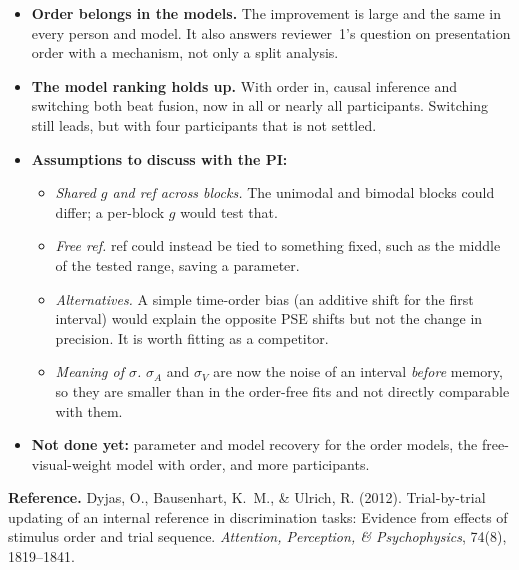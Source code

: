 \documentclass[11pt,a4paper]{article}
\begin{document}
\begin{itemize}
  \item \textbf{Order belongs in the models.} The improvement is large and the same in every person and
        model. It also answers reviewer~1's question on presentation order with a mechanism, not only a
        split analysis.
  \item \textbf{The model ranking holds up.} With order in, causal inference and switching both beat
        fusion, now in all or nearly all participants. Switching still leads, but with four
        participants that is not settled.
  \item \textbf{Assumptions to discuss with the PI:}
    \begin{itemize}
      \item \emph{Shared $g$ and ref across blocks.} The unimodal and bimodal blocks could differ; a
            per-block $g$ would test that.
      \item \emph{Free ref.} ref could instead be tied to something fixed, such as the middle of the
            tested range, saving a parameter.
      \item \emph{Alternatives.} A simple time-order bias (an additive shift for the first interval)
            would explain the opposite PSE shifts but not the change in precision. It is worth fitting as
            a competitor.
      \item \emph{Meaning of $\sigma$.} $\sigma_A$ and $\sigma_V$ are now the noise of an interval
            \emph{before} memory, so they are smaller than in the order-free fits and not directly
            comparable with them.
    \end{itemize}
  \item \textbf{Not done yet:} parameter and model recovery for the order models, the
        free-visual-weight model with order, and more participants.
\end{itemize}

\vspace{1em}
\textbf{Reference.} Dyjas, O., Bausenhart, K.~M., \& Ulrich, R. (2012). Trial-by-trial updating of an
internal reference in discrimination tasks: Evidence from effects of stimulus order and trial sequence.
\emph{Attention, Perception, \& Psychophysics}, 74(8), 1819--1841.
\end{document}
